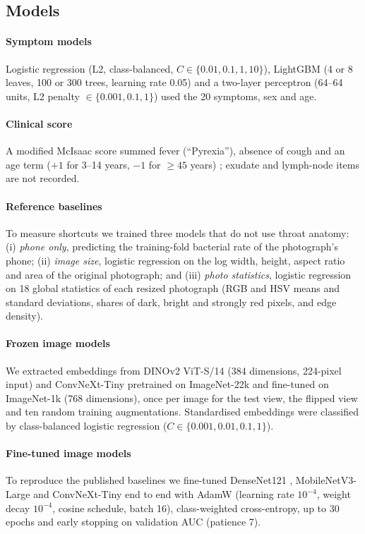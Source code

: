 \documentclass[preprint,12pt]{elsarticle}
\begin{document}
\subsection{Models}

\paragraph{Symptom models} Logistic regression (L2, class-balanced, $C \in \{0.01, 0.1, 1, 10\}$), LightGBM \cite{ke2017lightgbm} (4 or 8 leaves, 100 or 300 trees, learning rate 0.05) and a two-layer perceptron (64--64 units, L2 penalty $\in \{0.001, 0.1, 1\}$) used the 20 symptoms, sex and age.

\paragraph{Clinical score} A modified McIsaac score summed fever (``Pyrexia''), absence of cough and an age term ($+1$ for 3--14 years, $-1$ for $\geq 45$ years) \cite{mcisaac1998}; exudate and lymph-node items are not recorded.

\paragraph{Reference baselines} To measure shortcuts we trained three models that do not use throat anatomy: (i) \textit{phone only}, predicting the training-fold bacterial rate of the photograph's phone; (ii) \textit{image size}, logistic regression on the log width, height, aspect ratio and area of the original photograph; and (iii) \textit{photo statistics}, logistic regression on 18 global statistics of each resized photograph (RGB and HSV means and standard deviations, shares of dark, bright and strongly red pixels, and edge density).

\paragraph{Frozen image models} We extracted embeddings from DINOv2 ViT-S/14 \cite{oquab2024dinov2} (384 dimensions, 224-pixel input) and ConvNeXt-Tiny pretrained on ImageNet-22k and fine-tuned on ImageNet-1k \cite{liu2022convnext} (768 dimensions), once per image for the test view, the flipped view and ten random training augmentations. Standardised embeddings were classified by class-balanced logistic regression ($C \in \{0.001, 0.01, 0.1, 1\}$).

\paragraph{Fine-tuned image models} To reproduce the published baselines we fine-tuned DenseNet121 \cite{huang2017densenet}, MobileNetV3-Large \cite{howard2019mobilenetv3} and ConvNeXt-Tiny end to end with AdamW (learning rate $10^{-4}$, weight decay $10^{-4}$, cosine schedule, batch 16), class-weighted cross-entropy, up to 30 epochs and early stopping on validation AUC (patience 7).
\end{document}
